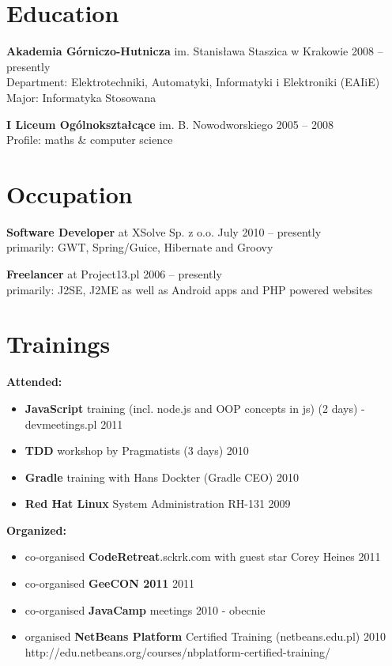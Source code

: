 \documentclass{res}
\begin{document}
\begin{resume} 

\section{Education} 
{\bf Akademia Górniczo-Hutnicza} im. Stanisława Staszica w Krakowie \hfill 2008 – presently\\
	Department: Elektrotechniki, Automatyki, Informatyki i Elektroniki (EAIiE) \\
	Major: Informatyka Stosowana 

{\bf I Liceum Ogólnokształcące} im. B. Nowodworskiego \hfill 2005 – 2008\\
	Profile: maths \& computer science

\section{Occupation}
{\bf Software Developer} at XSolve Sp. z o.o. \hfill July 2010 – presently\\
	primarily: GWT, Spring/Guice, Hibernate and Groovy

{\bf Freelancer} at Project13.pl \hfill 2006 – presently\\
	primarily: J2SE, J2ME as well as Android apps and PHP powered websites

\section{Trainings} 
{\bf Attended:}
\begin{itemize}
 \item \textbf{JavaScript} training (incl. node.js and OOP concepts in js) (2 days) - devmeetings.pl \hfill 2011
 \item \textbf{TDD} workshop by Pragmatists (3 days) \hfill 2010
 \item \textbf{Gradle} training with Hans Dockter (Gradle CEO) \hfill 2010
 \item \textbf{Red Hat Linux} System Administration RH-131 \hfill 2009
\end{itemize}
{\bf Organized:}
\begin{itemize}
 \item co-organised \textbf{CodeRetreat}.sckrk.com with guest star Corey Heines \hfill 2011
 \item co-organised \textbf{GeeCON 2011} \hfill 2011
 \item co-organised \textbf{JavaCamp} meetings \hfill 2010 - obecnie
 \item organised \textbf{NetBeans Platform} Certified Training (netbeans.edu.pl) \hfill 2010 \\
	http://edu.netbeans.org/courses/nbplatform-certified-training/ 
\end{itemize}


\end{resume}
\end{document}
